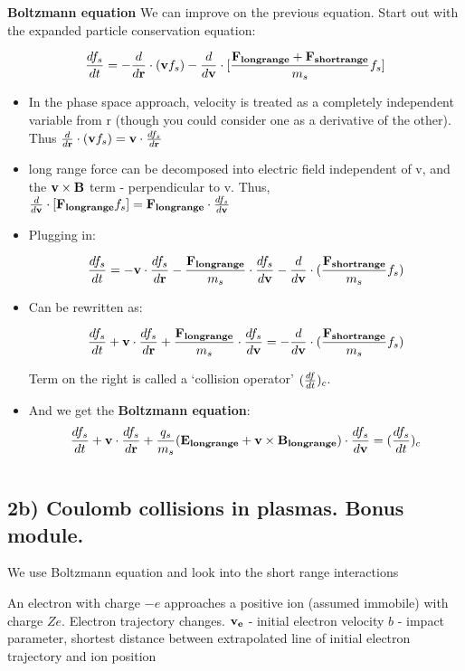 \documentclass[PlasmaNotes.tex]{subfiles}
\begin{document}
\textbf{Boltzmann equation}
	We can improve on the previous equation. Start out with the expanded particle conservation equation:
	
\[ \frac{d f_s}{d t} = -\frac{d }{d \mathbf{r}} \cdot (\mathbf{v} f_s) - \frac{d }{d \mathbf{v}} \cdot [\frac{\mathbf{F_{long range}} + \mathbf{F_{short range}}}{m_s} f_s] \]

\begin{itemize}
	\item In the phase space approach, velocity is treated as a completely independent variable from r (though you could consider one as a derivative of the other). Thus $\frac{d }{d \mathbf{r}} \cdot (\mathbf{v} f_s) = \mathbf{v} \cdot	\frac{d f_s}{d \mathbf{r}}$
		\item long range force can be decomposed into electric field independent of v, and the  $\mathbf{v} \times \mathbf{B}$ term - perpendicular to v. Thus, $\frac{d }{d \mathbf{v}} \cdot [\mathbf{F_{long range}} f_s] = \mathbf{F_{long range}}\cdot\frac{d f_s}{d \mathbf{v}} $
	\item Plugging in:
	
	\[ \frac{d f_s}{d t} = -\mathbf{v}\cdot\frac{d f_s}{d \mathbf{r}} - \frac{\mathbf{F_{long range}}}{m_s} \cdot \frac{d f_s}{d \mathbf{v}} - \frac{d }{d \mathbf{v}} \cdot (\frac{\mathbf{F_{short range}}}{m_s} f_s) \]
	\item Can be rewritten as:
	
	\[ \frac{d f_s}{d t} +\mathbf{v}\cdot\frac{d f_s}{d \mathbf{r}} + \frac{\mathbf{F_{long range}}}{m_s} \cdot \frac{d f_s}{d \mathbf{v}} = - \frac{d }{d \mathbf{v}} \cdot (\frac{\mathbf{F_{short range}}}{m_s} f_s) \]
	
	Term on the right is called a `collision operator' $(\frac{d f}{d t})_c$.	
	
\item And we get the \textbf{Boltzmann equation}:
	\[ \frac{d f_s}{d t} +\mathbf{v}\cdot\frac{d f_s}{d \mathbf{r}} + \frac{q_s}{m_s}(\mathbf{E_{long range}} + \mathbf{v} \times \mathbf{B_{long range}}) \cdot \frac{d f_s}{d \mathbf{v}} = (\frac{d f_s}{d t})_c \]
\end {itemize}

\[   \]

\subsection{2b) Coulomb collisions in plasmas. Bonus module.}
We use Boltzmann equation and look into the short range interactions

An electron with charge $-e$ approaches a positive ion (assumed immobile) with charge $Ze$. Electron trajectory changes.
$\mathbf{v_e}$ - initial electron velocity
$b$ - impact parameter, shortest distance between extrapolated line of initial electron trajectory and ion position
\end{document}
